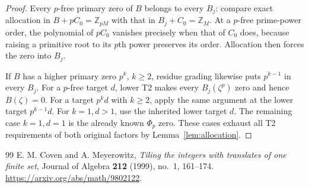 \documentclass[10pt,a4paper]{amsart}
\newcommand{\Z}{\mathbb Z}
\newcommand{\PhiC}{\Phi}
\begin{document}
\begin{proof}
Every $p$-free primary zero of $B$ belongs to every $B_j$: compare exact allocation in $B+pC_0=\Z_{pM}$ with that in $B_j+C_0=\Z_M$. At a $p$-free prime-power order, the polynomial of $pC_0$ vanishes precisely when that of $C_0$ does, because raising a primitive root to its $p$th power preserves its order. Allocation then forces the zero into $B_j$.

If $B$ has a higher primary zero $p^k$, $k\ge2$, residue grading likewise puts $p^{k-1}$ in every $B_j$. For a $p$-free target $d$, lower T2 makes every $B_j(\zeta^p)$ zero and hence $B(\zeta)=0$. For a target $p^kd$ with $k\ge2$, apply the same argument at the lower target $p^{k-1}d$. For $k=1,d>1$, use the inherited lower target $d$. The remaining case $k=1,d=1$ is the already known $\PhiC_p$ zero. These cases exhaust all T2 requirements of both original factors by Lemma~\ref{lem:allocation}.
\end{proof}

\begin{thebibliography}{99}
 E. M. Coven and A. Meyerowitz, \emph{Tiling the integers with translates of one finite set}, Journal of Algebra \textbf{212} (1999), no.~1, 161--174. \url{https://arxiv.org/abs/math/9802122}.
\end{thebibliography}
\end{document}
